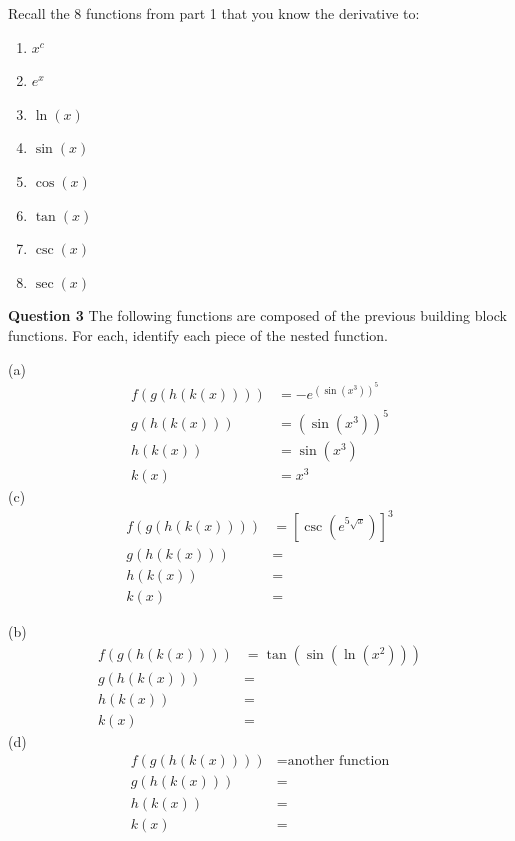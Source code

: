 \documentclass{article}
\begin{document}
\noindent Recall the 8 functions from part 1 that you know the derivative to:
\begin{multicols}{2}
  \begin{enumerate}
    \item $x^{c}$  \item $e^{x}$ \item $\ln(x)$ \item $\sin(x)$
    \item $\cos(x)$ \item $\tan(x)$ \item $\csc(x)$ \item $\sec(x)$
  \end{enumerate}
\end{multicols}

\noindent \textbf{Question 3}
The following functions are composed of the previous building block functions. For each, identify each piece of the nested function.

\begin{multicols}{2}
\noindent (a)
\begin{align*}
    f(g(h(k(x))))&=-e^{\left(\sin\left(x^{3}\right)\right)^{5}}\\
    g(h(k(x)))&=\left(\sin\left(x^{3}\right)\right)^{5}\\
    h(k(x))&=\sin\left(x^{3}\right)\\
    k(x)&=x^{3}
\end{align*}
\noindent (c)
\begin{align*}
    f(g(h(k(x))))&=\left[\csc\left(e^{5\sqrt{x}}\right)\right]^{3}\\
    g(h(k(x)))&=\\
    h(k(x))&=\\
    k(x)&=
\end{align*}

\columnbreak

\noindent (b)
\begin{align*}
    f(g(h(k(x))))&=\tan\left(\sin\left(\ln\left(x^{2}\right)\right)\right)\\
    g(h(k(x)))&=\\
    h(k(x))&=\\
    k(x)&=
\end{align*}
\noindent (d)
\begin{align*}
    f(g(h(k(x))))&=\text{another function}\\
    g(h(k(x)))&=\\
    h(k(x))&=\\
    k(x)&=
\end{align*}
\end{multicols}
\end{document}
